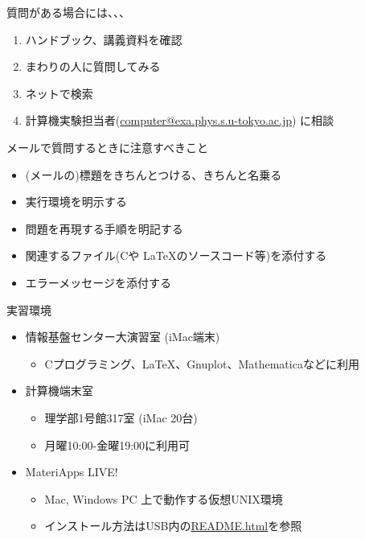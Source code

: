 \documentclass[dvipdfmx]{beamer}
\begin{document}
\begin{frame}[t]{質問がある場合には、、、}
  \begin{enumerate}
  \item ハンドブック、講義資料を確認
  \item まわりの人に質問してみる
  \item ネットで検索
  \item 計算機実験担当者(\href{mailto:computer@exa.phys.s.u-tokyo.ac.jp}{computer@exa.phys.s.u-tokyo.ac.jp}) に相談
  \end{enumerate}
  メールで質問するときに注意すべきこと
  \begin{itemize}
  \item (メールの)標題をきちんとつける、きちんと名乗る
  \item 実行環境を明示する
  \item 問題を再現する手順を明記する
  \item 関連するファイル(Cや \LaTeX のソースコード等)を添付する
  \item エラーメッセージを添付する
  \end{itemize}
\end{frame}

\begin{frame}[t,fragile]{実習環境}
  \begin{itemize}
    \setlength{\itemsep}{1em}
  \item 情報基盤センター大演習室 (iMac端末)
    \begin{itemize}
    \item Cプログラミング、\LaTeX、Gnuplot、Mathematicaなどに利用
    \end{itemize}
  \item 計算機端末室
    \begin{itemize}
    \item 理学部1号館317室 (iMac 20台)
    \item 月曜10:00-金曜19:00に利用可
    \end{itemize}
  \item MateriApps LIVE!
    \begin{itemize}
    \item Mac, Windows PC 上で動作する仮想UNIX環境
    \item インストール方法はUSB内の\href{https://github.com/cmsi/MateriAppsLive/wiki/MateriAppsLive-ltx}{README.html}を参照
    \end{itemize}
  \end{itemize}
\end{frame}
\end{document}
